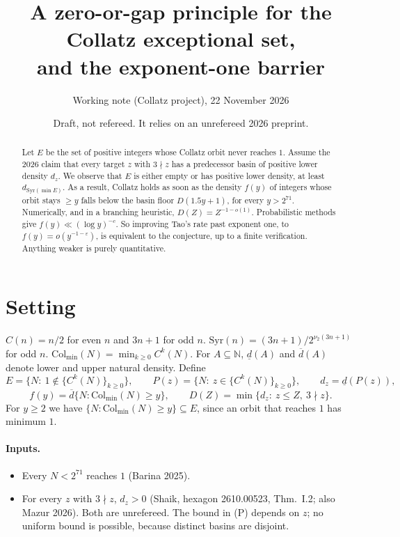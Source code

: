 \documentclass[11pt]{article}
\title{A zero-or-gap principle for the Collatz exceptional set,\\ and the exponent-one barrier}
\author{Working note (Collatz project), 22 November 2026}
\date{Draft, not refereed. It relies on an unrefereed 2026 preprint.}
\theoremstyle{remark}
\newcommand{\Col}{\mathrm{Col}}
\newcommand{\Syr}{\mathrm{Syr}}
\newcommand{\dlow}{\underline{d}}
\newcommand{\dup}{\overline{d}}
\begin{document}
\maketitle

\begin{abstract}
Let $E$ be the set of positive integers whose Collatz orbit never reaches $1$. Assume the 2026
claim that every target $z$ with $3\nmid z$ has a predecessor basin of positive lower density
$d_z$. We observe that $E$ is either empty or has positive lower density, at least
$d_{\Syr(\min E)}$. As a result, Collatz holds as soon as the density $f(y)$ of integers whose
orbit stays $\ge y$ falls below the basin floor $D(1.5y+1)$, for every $y>2^{71}$. Numerically,
and in a branching heuristic, $D(Z)=Z^{-1-o(1)}$. Probabilistic methods give
$f(y)\ll(\log y)^{-c}$. So improving Tao's rate past exponent one, to $f(y)=o(y^{-1-\varepsilon})$,
is equivalent to the conjecture, up to a finite verification. Anything weaker is purely
quantitative.
\end{abstract}

\section{Setting}
$C(n)=n/2$ for even $n$ and $3n+1$ for odd $n$. $\Syr(n)=(3n+1)/2^{\nu_2(3n+1)}$ for odd $n$.
$\Col_{\min}(N)=\min_{k\ge0}C^k(N)$. For $A\subseteq\mathbb N$, $\dlow(A)$ and $\dup(A)$ denote
lower and upper natural density. Define
\[
E=\{N:\ 1\notin\{C^k(N)\}_{k\ge0}\},\qquad
P(z)=\{N:\ z\in\{C^k(N)\}_{k\ge0}\},\qquad
d_z=\dlow(P(z)),
\]
\[
f(y)=\dup\{N:\Col_{\min}(N)\ge y\},\qquad D(Z)=\min\{d_z:\ z\le Z,\ 3\nmid z\}.
\]
For $y\ge2$ we have $\{N:\Col_{\min}(N)\ge y\}\subseteq E$, since an orbit that reaches $1$ has minimum $1$.

\paragraph{Inputs.}
\begin{itemize}
\item[(V)] Every $N<2^{71}$ reaches $1$ (Barina 2025).
\item[(P)] For every $z$ with $3\nmid z$, $d_z>0$ (Shaik, hexagon 2610.00523, Thm.~I.2; also
  Mazur 2026). Both are unrefereed. The bound in (P) depends on $z$; no uniform bound is
  possible, because distinct basins are disjoint.
\end{itemize}
\end{document}
